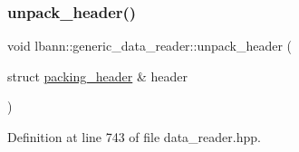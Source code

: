 \mbox{\label{classlbann_1_1generic__data__reader_a3e1c13778c04ca9fa5136ee7ee3893fb}} 
\subsubsection{\texorpdfstring{unpack\+\_\+header()}{unpack\_header()}}
{\footnotesize\ttfamily void lbann\+::generic\+\_\+data\+\_\+reader\+::unpack\+\_\+header (\begin{DoxyParamCaption}\item[{struct \hyperlink{structlbann_1_1generic__data__reader_1_1packing__header}{packing\+\_\+header} \&}]{header }\end{DoxyParamCaption})\hspace{0.3cm}{\ttfamily [inline]}}



Definition at line 743 of file data\+\_\+reader.\+hpp.


